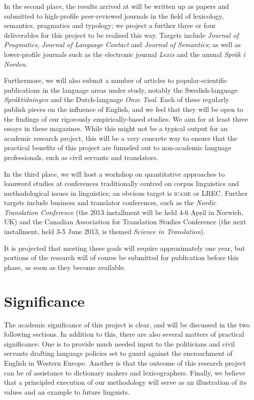 \documentclass[a4paper]{article}
\begin{document}
In the second place, the results arrived at will be written up as papers and submitted to high-profile peer-reviewed journals in the field of lexicology, semantics, pragmatics and typology; we project a further three or four deliverables for this project to be realised this way. Targets include \emph{Journal of Pragmatics}, \emph{Journal of Language Contact} and \emph{Journal of Semantics}; as well as lower-profile journals such as the electronic journal \emph{Lexis} and the annual \emph{Spr\aa k i Norden}.

Furthermore, we will also submit a number of articles to popular-scientific publications in the language areas under study, notably the Swedish-language \emph{Spr\aa ktidningen} and the Dutch-language \emph{Onze Taal}.
Each of these regularly publish pieces on the influence of English, and we feel that they will be open to the findings of our rigorously empirically-based studies. We aim for at least three essays in these magazines. While this might not be a typical output for an academic research project, this will be a very concrete way to ensure that the practical benefits of this project are funneled out to non-academic language professionals, such as civil servants and translators.

In the third place, we will host a workshop on quantitative approaches to loanword studies at conferences traditionally centred on corpus linguistics and methodological issues in linguistics; an obvious target is \textsc{icame} or LREC. Further targets include business and translator conferences, such as the \emph{Nordic Translation Conference} (the 2013 installment will be held 4-6 April in Norwich, UK) and the Canadian Association for Translation Studies Conference (the next installment, held 3-5 June 2013, is themed \emph{Science in Translation}). 

It is projected that meeting these goals will require approximately one year, but portions of the research will of course be submitted for publication before this phase, as soon as they become available.



\section{Significance}
The academic significance of this project is clear, and will be discussed in the two following sections. In addition to this, there are also several matters of  practical significance. One is to provide much needed input to the politicians and civil servants drafting language policies set to guard against the encroachment of English in Western Europe. Another is that the outcome of this research project can be of assistance to dictionary makers and lexicographers. Finally, we believe that a principled execution of our methodology will serve as an illustration of its values and an example to future linguists.
\end{document}
